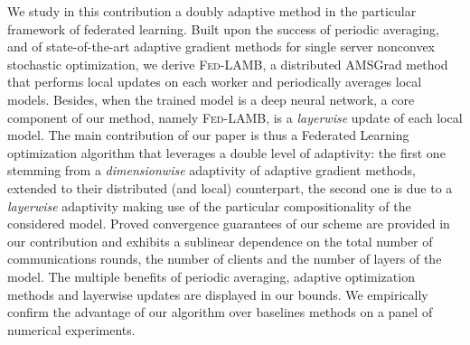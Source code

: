 \documentclass[11pt]{article}
\newcommand{\algo}{\textsc{Fed-LAMB}}
\begin{document}
We study in this contribution a doubly adaptive method in the particular framework of federated learning.
Built upon the success of periodic averaging, and of state-of-the-art adaptive gradient methods for single server nonconvex stochastic optimization, we derive \algo, a distributed AMSGrad method that performs local updates on each worker and periodically averages local models. 
Besides, when the trained model is a deep neural network, a core component of our method, namely \algo, is a \emph{layerwise} update of each local model.
The main contribution of our paper is thus a Federated Learning optimization algorithm that leverages a double level of adaptivity: the first one stemming from a \emph{dimensionwise} adaptivity of adaptive gradient methods, extended to their distributed (and local) counterpart, the second one is due to a  \emph{layerwise} adaptivity making use of the particular compositionality of the considered model.
Proved convergence guarantees of our scheme are provided in our contribution and exhibits a sublinear dependence on the total number of communications rounds, the number of clients and the number of layers of the model.
The multiple benefits of periodic averaging, adaptive optimization methods and layerwise updates are displayed in our bounds.
We empirically confirm the advantage of our algorithm over baselines methods on a panel of numerical experiments.
\end{document}
